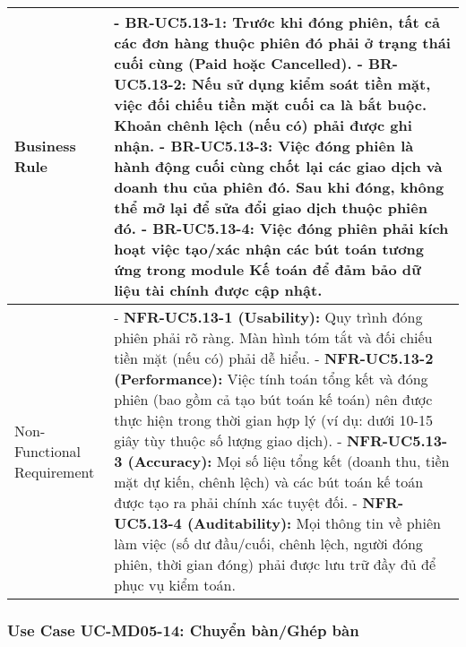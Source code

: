 \begin{longtable}{|m{4cm}|p{11cm}|}
Business Rule & - \textbf{BR-UC5.13-1:} Trước khi đóng phiên, tất cả các đơn hàng thuộc phiên đó phải ở trạng thái cuối cùng (Paid hoặc Cancelled). \newline - \textbf{BR-UC5.13-2:} Nếu sử dụng kiểm soát tiền mặt, việc đối chiếu tiền mặt cuối ca là bắt buộc. Khoản chênh lệch (nếu có) phải được ghi nhận. \newline - \textbf{BR-UC5.13-3:} Việc đóng phiên là hành động cuối cùng chốt lại các giao dịch và doanh thu của phiên đó. Sau khi đóng, không thể mở lại để sửa đổi giao dịch thuộc phiên đó. \newline - \textbf{BR-UC5.13-4:} Việc đóng phiên phải kích hoạt việc tạo/xác nhận các bút toán tương ứng trong module Kế toán để đảm bảo dữ liệu tài chính được cập nhật. \\
\hline
Non-Functional Requirement & - \textbf{NFR-UC5.13-1 (Usability):} Quy trình đóng phiên phải rõ ràng. Màn hình tóm tắt và đối chiếu tiền mặt (nếu có) phải dễ hiểu. \newline - \textbf{NFR-UC5.13-2 (Performance):} Việc tính toán tổng kết và đóng phiên (bao gồm cả tạo bút toán kế toán) nên được thực hiện trong thời gian hợp lý (ví dụ: dưới 10-15 giây tùy thuộc số lượng giao dịch). \newline - \textbf{NFR-UC5.13-3 (Accuracy):} Mọi số liệu tổng kết (doanh thu, tiền mặt dự kiến, chênh lệch) và các bút toán kế toán được tạo ra phải chính xác tuyệt đối. \newline - \textbf{NFR-UC5.13-4 (Auditability):} Mọi thông tin về phiên làm việc (số dư đầu/cuối, chênh lệch, người đóng phiên, thời gian đóng) phải được lưu trữ đầy đủ để phục vụ kiểm toán. \\
\hline
\end{longtable}

\subsubsection{Use Case UC-MD05-14: Chuyển bàn/Ghép bàn}

